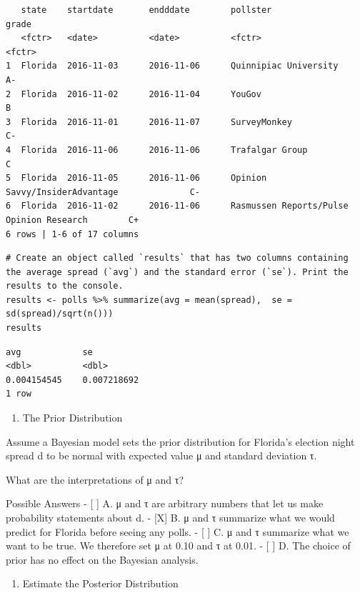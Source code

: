 \documentclass[
]{article}
\providecommand{\tightlist}{%
  \setlength{\itemsep}{0pt}\setlength{\parskip}{0pt}}
\begin{document}
\begin{verbatim}
   state    startdate       endddate        pollster                                        grade
   <fctr>   <date>          <date>          <fctr>                                          <fctr>
1  Florida  2016-11-03      2016-11-06      Quinnipiac University                       A-  
2  Florida  2016-11-02      2016-11-04      YouGov                                      B   
3  Florida  2016-11-01      2016-11-07      SurveyMonkey                                C-  
4  Florida  2016-11-06      2016-11-06      Trafalgar Group                             C   
5  Florida  2016-11-05      2016-11-06      Opinion Savvy/InsiderAdvantage              C-  
6  Florida  2016-11-02      2016-11-06      Rasmussen Reports/Pulse Opinion Research        C+  
6 rows | 1-6 of 17 columns
\end{verbatim}

\begin{verbatim}
# Create an object called `results` that has two columns containing the average spread (`avg`) and the standard error (`se`). Print the results to the console.
results <- polls %>% summarize(avg = mean(spread),  se = sd(spread)/sqrt(n()))
results
\end{verbatim}

\begin{verbatim}
avg            se
<dbl>          <dbl>
0.004154545    0.007218692
1 row
\end{verbatim}

\begin{enumerate}
\def\labelenumi{\arabic{enumi}.}
\setcounter{enumi}{6}
\tightlist
\item
  The Prior Distribution
\end{enumerate}

Assume a Bayesian model sets the prior distribution for Florida's
election night spread d to be normal with expected value μ and standard
deviation τ.

What are the interpretations of μ and τ?

Possible Answers - {[} {]} A. μ and τ are arbitrary numbers that let us
make probability statements about d. - {[}X{]} B. μ and τ summarize what
we would predict for Florida before seeing any polls. - {[} {]} C. μ and
τ summarize what we want to be true. We therefore set μ at 0.10 and τ at
0.01. - {[} {]} D. The choice of prior has no effect on the Bayesian
analysis.

\begin{enumerate}
\def\labelenumi{\arabic{enumi}.}
\setcounter{enumi}{7}
\tightlist
\item
  Estimate the Posterior Distribution
\end{enumerate}
\end{document}
